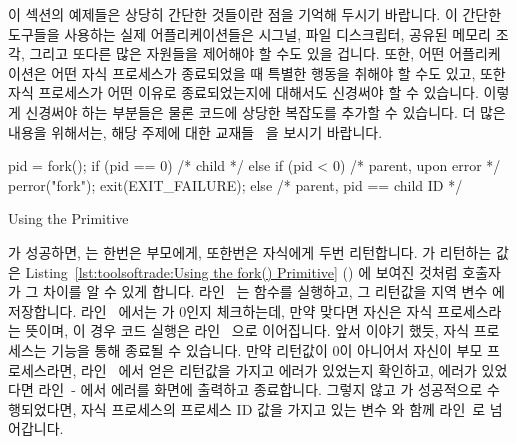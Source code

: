이 섹션의 예제들은 상당히 간단한 것들이란 점을 기억해 두시기 바랍니다.
이 간단한 도구들을 사용하는 실제 어플리케이션들은 시그널, 파일 디스크립터,
공유된 메모리 조각, 그리고 또다른 많은 자원들을 제어해야 할 수도 있을 겁니다.
또한, 어떤 어플리케이션은 어떤 자식 프로세스가 종료되었을 때 특별한 행동을
취해야 할 수도 있고, 또한 자식 프로세스가 어떤 이유로 종료되었는지에 대해서도
신경써야 할 수 있습니다.
이렇게 신경써야 하는 부분들은 물론 코드에 상당한 복잡도를 추가할 수 있습니다.
더 많은 내용을 위해서는, 해당 주제에 대한
교재들~\cite{WRichardStevens1992,StewartWeiss2013UNIX} 을 보시기 바랍니다.

\begin{listing}[tbp]
\begin{linelabel}
\begin{VerbatimL}[commandchars=\%\[\]]
pid = fork();%
if (pid == 0) {%
	/* child */%
} else if (pid < 0) {%
	/* parent, upon error */%
	perror("fork");
	exit(EXIT_FAILURE);%
} else {
	/* parent, pid == child ID */%
}
\end{VerbatimL}
\end{linelabel}
\caption{Using the  Primitive}
\label{lst:toolsoftrade:Using the fork() Primitive}
\end{listing}

\begin{lineref}
 가 성공하면, 는 한번은 부모에게, 또한번은 자식에게 두번
리턴합니다.
 가 리턴하는 값은
Listing~\ref{lst:toolsoftrade:Using the fork() Primitive}
() 에 보여진 것처럼 호출자가 그 차이를 알 수 있게 합니다.
라인~ 는 함수를 실행하고, 그 리턴값을 지역 변수 
에 저장합니다.
라인~ 에서는  가 0인지 체크하는데, 만약 맞다면 자신은 자식
프로세스라는 뜻이며, 이 경우 코드 실행은 라인~ 으로 이어집니다.
앞서 이야기 했듯, 자식 프로세스는  기능을 통해 종료될 수 있습니다.
만약  리턴값이 0이 아니어서 자신이 부모 프로세스라면,
라인~ 에서 얻은  리턴값을 가지고 에러가 있었는지
확인하고, 에러가 있었다면 라인~- 에서 에러를
화면에 출력하고 종료합니다.
그렇지 않고  가 성공적으로 수행되었다면, 자식 프로세스의 프로세스 ID
값을 가지고 있는 변수  와 함께 라인~로 넘어갑니다.
\end{lineref}
\iffalse


